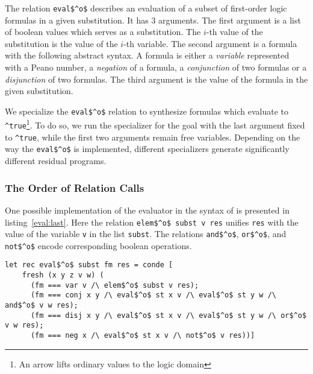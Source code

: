 The relation \lstinline{eval$^o$} describes an evaluation of a subset of first-order logic formulas in a given substitution.
It has 3 arguments.
The first argument is a list of boolean values which serves as a substitution.
The $i$-th value of the substitution is the value of the $i$-th variable.
The second argument is a formula with the following abstract syntax.
A formula is either a \emph{variable} represented with a Peano number, a \emph{negation} of a formula, a \emph{conjunction} of two formulas or a \emph{disjunction} of two formulas.
The third argument is the value of the formula in the given substitution.

We specialize the \lstinline{eval$^o$} relation to synthesize formulas which evaluate to \lstinline{^true}\footnote{An arrow lifts ordinary values to the logic domain}.
To do so, we run the specializer for the goal with the last argument fixed to \lstinline{^true}, while the first two arguments remain free variables.
Depending on the way the \lstinline{eval$^o$} is implemented, different specializers generate significantly different residual programs.

\subsubsection{The Order of Relation Calls}

One possible implementation of the evaluator in the syntax of \oc is presented in listing~\ref{eval:last}.
Here the relation \lstinline{elem$^o$ subst v res} unifies \lstinline{res} with the value of the variable \lstinline{v} in the list \lstinline{subst}.
The relations \lstinline{and$^o$}, \lstinline{or$^o$}, and \lstinline{not$^o$} encode corresponding boolean operations.

\begin{figure*}[!h]
  \centering
  \begin{minipage}{0.95\textwidth}
    \begin{lstlisting}[label={eval:last}, caption={Evaluator of formulas with boolean operation last}, captionpos=b, frame=tb]
  let rec eval$^o$ subst fm res = conde [
    fresh (x y z v w) (
      (fm === var v /\ elem$^o$ subst v res);
      (fm === conj x y /\ eval$^o$ st x v /\ eval$^o$ st y w /\ and$^o$ v w res);
      (fm === disj x y /\ eval$^o$ st x v /\ eval$^o$ st y w /\ or$^o$ v w res);
      (fm === neg x /\ eval$^o$ st x v /\ not$^o$ v res))]
    \end{lstlisting}
  \end{minipage}
\end{figure*}

